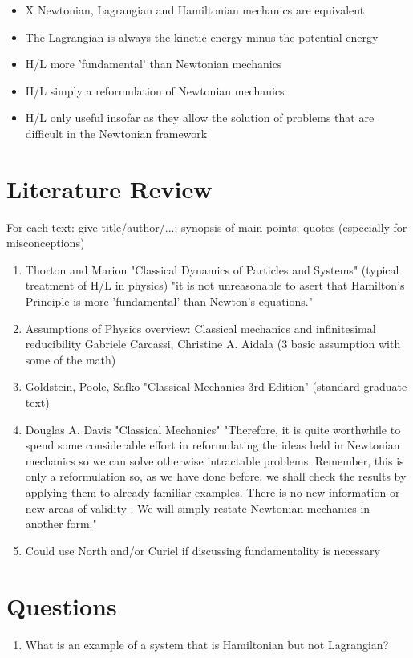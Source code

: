 \documentclass{article}
\begin{document}
\begin{itemize}
	\item X Newtonian, Lagrangian and Hamiltonian mechanics are equivalent
	\item The Lagrangian is always the kinetic energy minus the potential energy 
	\item H/L more 'fundamental' than Newtonian mechanics
	\item H/L simply a reformulation of Newtonian mechanics
	\item H/L only useful insofar as they allow the solution of problems that are difficult in the Newtonian framework
\end{itemize}

\section{Literature Review}
For each text: give title/author/...; synopsis of main points; quotes (especially for misconceptions)

\begin{enumerate}
\item Thorton and Marion "Classical Dynamics of Particles and Systems"
(typical treatment of H/L in physics)
"it is not unreasonable to asert that Hamilton's Principle is more 'fundamental' than Newton's equations."
\item Assumptions of Physics overview:
Classical mechanics and infinitesimal reducibility
Gabriele Carcassi, Christine A. Aidala (3 basic assumption with some of the math)
\item Goldstein, Poole, Safko "Classical Mechanics 3rd Edition"
(standard graduate text)
\item Douglas A. Davis "Classical Mechanics"
"Therefore, it is quite worthwhile to spend some considerable effort in reformulating the ideas held in Newtonian mechanics so we can solve otherwise intractable problems. Remember, this is only a reformulation so, as we have done before, we shall check the results by applying them to already familiar examples. There is no new information or new areas of validity . We will simply restate Newtonian mechanics in another form."
\item Could use North and/or Curiel if discussing fundamentality is necessary

\end{enumerate}
\section{Questions}
\begin{enumerate}
\item What is an example of a system that is Hamiltonian but not Lagrangian?
\end{enumerate}
\end{document}
